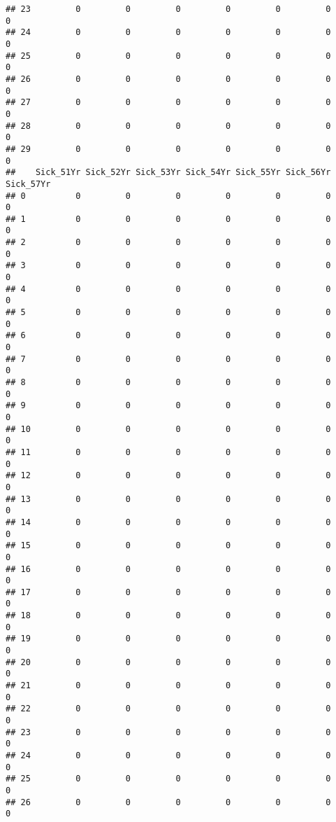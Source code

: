 \documentclass[
]{article}
\begin{document}
\begin{verbatim}
## 23         0         0         0         0         0         0         0
## 24         0         0         0         0         0         0         0
## 25         0         0         0         0         0         0         0
## 26         0         0         0         0         0         0         0
## 27         0         0         0         0         0         0         0
## 28         0         0         0         0         0         0         0
## 29         0         0         0         0         0         0         0
##    Sick_51Yr Sick_52Yr Sick_53Yr Sick_54Yr Sick_55Yr Sick_56Yr Sick_57Yr
## 0          0         0         0         0         0         0         0
## 1          0         0         0         0         0         0         0
## 2          0         0         0         0         0         0         0
## 3          0         0         0         0         0         0         0
## 4          0         0         0         0         0         0         0
## 5          0         0         0         0         0         0         0
## 6          0         0         0         0         0         0         0
## 7          0         0         0         0         0         0         0
## 8          0         0         0         0         0         0         0
## 9          0         0         0         0         0         0         0
## 10         0         0         0         0         0         0         0
## 11         0         0         0         0         0         0         0
## 12         0         0         0         0         0         0         0
## 13         0         0         0         0         0         0         0
## 14         0         0         0         0         0         0         0
## 15         0         0         0         0         0         0         0
## 16         0         0         0         0         0         0         0
## 17         0         0         0         0         0         0         0
## 18         0         0         0         0         0         0         0
## 19         0         0         0         0         0         0         0
## 20         0         0         0         0         0         0         0
## 21         0         0         0         0         0         0         0
## 22         0         0         0         0         0         0         0
## 23         0         0         0         0         0         0         0
## 24         0         0         0         0         0         0         0
## 25         0         0         0         0         0         0         0
## 26         0         0         0         0         0         0         0

\end{verbatim}
\end{document}
